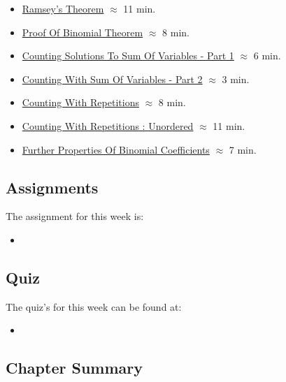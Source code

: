 \begin{itemize}
    \item \href{https://applied.cs.colorado.edu/mod/hvp/view.php?id=51805}{Ramsey's Theorem} $\approx$ 11 min.
    \item \href{https://applied.cs.colorado.edu/mod/hvp/view.php?id=51806}{Proof Of Binomial Theorem} $\approx$ 8 min.
    \item \href{https://applied.cs.colorado.edu/mod/hvp/view.php?id=51807}{Counting Solutions To Sum Of Variables - Part 1} $\approx$ 6 min.
    \item \href{https://applied.cs.colorado.edu/mod/hvp/view.php?id=51808}{Counting With Sum Of Variables - Part 2} $\approx$ 3 min.
    \item \href{https://applied.cs.colorado.edu/mod/hvp/view.php?id=51809}{Counting With Repetitions} $\approx$ 8 min.
    \item \href{https://applied.cs.colorado.edu/mod/hvp/view.php?id=51810}{Counting With Repetitions : Unordered} $\approx$ 11 min.
    \item \href{https://applied.cs.colorado.edu/mod/hvp/view.php?id=51811}{Further Properties Of Binomial Coefficients} $\approx$ 7 min.
\end{itemize}

\subsection{Assignments}

The assignment for this week is:

\begin{itemize}
    \item {}
\end{itemize}

\subsection{Quiz}

The quiz's for this week can be found at:

\begin{itemize}
    \item {}
\end{itemize}

\newpage

\subsection{Chapter Summary}

